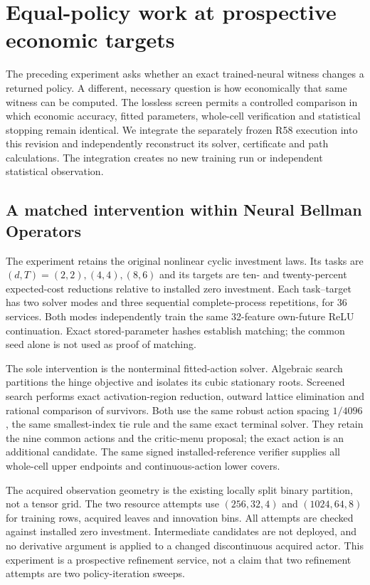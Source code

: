\section{Equal-policy work at prospective economic targets}\label{sec:study59}
The preceding experiment asks whether an exact trained-neural witness changes a returned policy. A different, necessary question is how economically that same witness can be computed. The lossless screen permits a controlled comparison in which economic accuracy, fitted parameters, whole-cell verification and statistical stopping remain identical. We integrate the separately frozen R58 execution into this revision and independently reconstruct its solver, certificate and path calculations. The integration creates no new training run or independent statistical observation.

\subsection{A matched intervention within Neural Bellman Operators}
The experiment retains the original nonlinear cyclic investment laws. Its tasks are $(d,T)=(2,2),(4,4),(8,6)$ and its targets are ten- and twenty-percent expected-cost reductions relative to installed zero investment. Each task--target has two solver modes and three sequential complete-process repetitions, for 36 services. Both modes independently train the same 32-feature own-future ReLU continuation. Exact stored-parameter hashes establish matching; the common seed alone is not used as proof of matching.

The sole intervention is the nonterminal fitted-action solver. Algebraic search partitions the hinge objective and isolates its cubic stationary roots. Screened search performs exact activation-region reduction, outward lattice elimination and rational comparison of survivors. Both use the same robust action spacing $1/4096$, the same smallest-index tie rule and the same exact terminal solver. They retain the nine common actions and the critic-menu proposal; the exact action is an additional candidate. The same signed installed-reference verifier supplies all whole-cell upper endpoints and continuous-action lower covers.

The acquired observation geometry is the existing locally split binary partition, not a tensor grid. The two resource attempts use $(256,32,4)$ and $(1024,64,8)$ for training rows, acquired leaves and innovation bins. All attempts are checked against installed zero investment. Intermediate candidates are not deployed, and no derivative argument is applied to a changed discontinuous acquired actor. This experiment is a prospective refinement service, not a claim that two refinement attempts are two policy-iteration sweeps.

